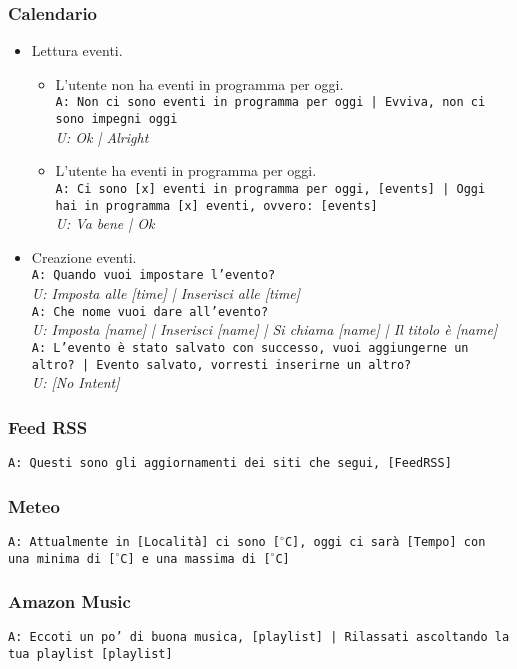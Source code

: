 \subsubsection{Calendario}
\begin{itemize}
	\item Lettura eventi.
	\begin{itemize}
		\item L'utente non ha eventi in programma per oggi.\\
		\texttt{A: Non ci sono eventi in programma per oggi | Evviva, non ci sono impegni oggi}\\
		\textit{U: Ok | Alright}
		\item L'utente ha eventi in programma per oggi.\\
		\texttt{A: Ci sono [x] eventi in programma per oggi, [events] | Oggi hai in programma [x] eventi, ovvero: [events]}\\
		\textit{U: Va bene | Ok}
	\end{itemize}
	\item Creazione eventi.\\
	\texttt{A: Quando vuoi impostare l'evento?}\\
	\textit{U: Imposta alle [time] | Inserisci alle [time]}\\
	\texttt{A: Che nome vuoi dare all'evento?}\\
	\textit{U: Imposta [name] | Inserisci [name] | Si chiama [name] | Il titolo è [name]}\\
	\texttt{A: L'evento è stato salvato con successo, vuoi aggiungerne un altro? | Evento salvato, vorresti inserirne un altro?}\\
	\textit{U: [No Intent]}
\end{itemize}
\subsubsection{Feed RSS}
\texttt{A: Questi sono gli aggiornamenti dei siti che segui, [FeedRSS]}

\subsubsection{Meteo}
\texttt{A: Attualmente in [Località] ci sono [$^\circ$C], oggi ci sarà [Tempo] con una minima di [$^\circ$C] e una massima di [$^\circ$C]}

\subsubsection{Amazon Music}
\texttt{A: Eccoti un po' di buona musica, [playlist] | Rilassati ascoltando la tua playlist [playlist]} 

